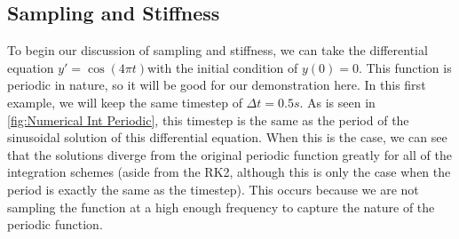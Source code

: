 \documentclass[12pt]{report}
\begin{document}
{\subsection{Sampling and Stiffness}\label{sampling and stiffness}
 To begin our discussion of sampling and stiffness, we can take the differential equation $y'=\cos(4\pi t)$with the initial condition of $y(0)=0$. This function is periodic in nature, so it will be good for our demonstration here. In this first example, we will keep the same timestep of $\Delta t=0.5s$. As is seen in \ref{fig:Numerical Int Periodic}, this timestep is the same as the period of the sinusoidal solution of this differential equation. When this is the case, we can see that the solutions diverge from the original periodic function greatly for all of the integration schemes (aside from the RK2, although this is only the case when the period is exactly the same as the timestep). This occurs because we are not sampling the function at a high enough frequency to capture the nature of the periodic function.

}
\end{document}

